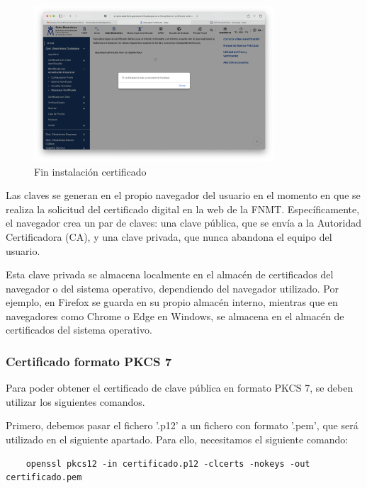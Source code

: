 \begin{figure}[H]
    \centering
    \includegraphics[width=0.8\textwidth]{fin_instalacion_ej5a.png}
    \caption{Fin instalación certificado}
    \label{fig:fin_instalacion}
\end{figure}

Las claves se generan en el propio navegador del usuario en el momento en que se realiza la solicitud del certificado digital en la web de la FNMT. Específicamente, el navegador crea un par de claves: una clave pública, que se envía a la Autoridad Certificadora (CA), y una clave privada, que nunca abandona el equipo del usuario.

Esta clave privada se almacena localmente en el almacén de certificados del navegador o del sistema operativo, dependiendo del navegador utilizado. Por ejemplo, en Firefox se guarda en su propio almacén interno, mientras que en navegadores como Chrome o Edge en Windows, se almacena en el almacén de certificados del sistema operativo.

\subsubsection{Certificado formato PKCS 7}

Para poder obtener el certificado de clave pública en formato PKCS 7, se deben utilizar los siguientes comandos.

Primero, debemos pasar el fichero '.p12' a un fichero con formato '.pem', que será utilizado en el siguiente apartado. Para ello, necesitamos el siguiente comando:

\begin{verbatim}
    openssl pkcs12 -in certificado.p12 -clcerts -nokeys -out certificado.pem
\end{verbatim}

